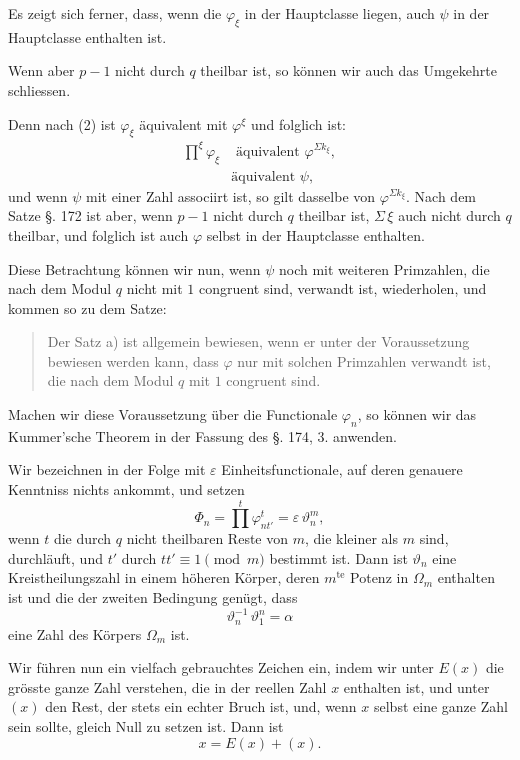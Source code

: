 \documentclass[12pt,a4paper]{article}
\begin{document}
Es zeigt sich ferner, dass, wenn die $\varphi_\xi$ in der Hauptclasse liegen, auch $\psi$ in der Hauptclasse enthalten ist.

Wenn aber $p-1$ nicht durch $q$ theilbar ist, so können wir auch das Umgekehrte schliessen.

Denn nach (2) ist $\varphi_\xi$ äquivalent mit $\varphi^\xi$ und folglich ist:
\begin{align*}
\prod^\xi \varphi_\xi &\text{ äquivalent } \varphi^{\Sigma k_\xi},\\
&\text{äquivalent } \psi,
\end{align*}
und wenn $\psi$ mit einer Zahl associirt ist, so gilt dasselbe von $\varphi^{\Sigma k_\xi}$. Nach dem Satze \S. 172 ist aber, wenn $p-1$ nicht durch $q$ theilbar ist, $\Sigma\,\xi$ auch nicht durch $q$ theilbar, und folglich ist auch $\varphi$ selbst in der Hauptclasse enthalten.

Diese Betrachtung können wir nun, wenn $\psi$ noch mit weiteren Primzahlen, die nach dem Modul $q$ nicht mit $1$ congruent sind, verwandt ist, wiederholen, und kommen so zu dem Satze:

\begin{quote}
Der Satz a) ist allgemein bewiesen, wenn er unter der Voraussetzung bewiesen werden kann, dass $\varphi$ nur mit solchen Primzahlen verwandt ist, die nach dem Modul $q$ mit $1$ congruent sind.
\end{quote}

Machen wir diese Voraussetzung über die Functionale $\varphi_n$, so können wir das Kummer'sche Theorem in der Fassung des \S. 174, 3. anwenden.

Wir bezeichnen in der Folge mit $\varepsilon$ Einheitsfunctionale, auf deren genauere Kenntniss nichts ankommt, und setzen
\begin{equation}\label{eq:182-7}
\Phi_n = \prod^t \varphi_{nt'}^t = \varepsilon\,\vartheta_n^m,
\end{equation}
wenn $t$ die durch $q$ nicht theilbaren Reste von $m$, die kleiner als $m$ sind, durchläuft, und $t'$ durch $tt' \equiv 1 \pmod{m}$ bestimmt ist. Dann ist $\vartheta_n$ eine Kreistheilungszahl in einem höheren Körper, deren $m^{\text{te}}$ Potenz in $\Omega_m$ enthalten ist und die der zweiten Bedingung genügt, dass
\begin{equation}\label{eq:182-8}
\vartheta_n^{-1}\,\vartheta_1^n = \alpha
\end{equation}
eine Zahl des Körpers $\Omega_m$ ist.

Wir führen nun ein vielfach gebrauchtes Zeichen ein, indem wir unter $E(x)$ die grösste ganze Zahl verstehen, die in der reellen Zahl $x$ enthalten ist, und unter $(x)$ den Rest, der stets ein echter Bruch ist, und, wenn $x$ selbst eine ganze Zahl sein sollte, gleich Null zu setzen ist. Dann ist
\begin{equation}\label{eq:182-9}
x = E(x) + (x).
\end{equation}
\end{document}
